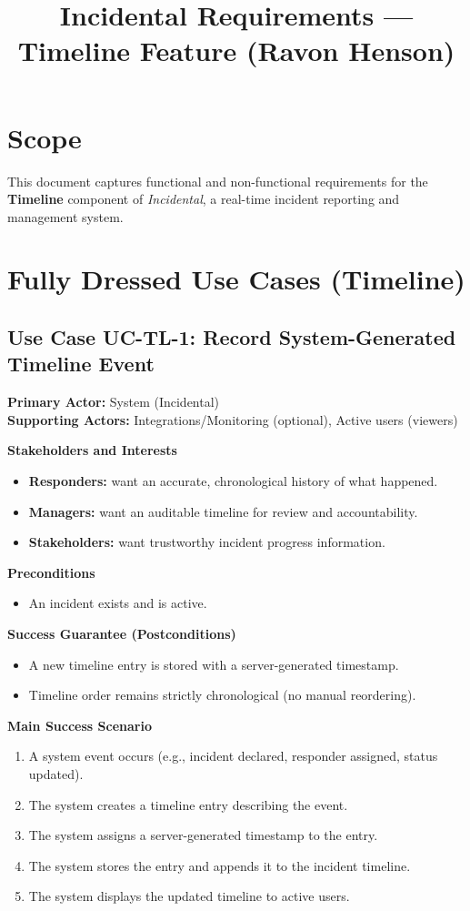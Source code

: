 \documentclass[11pt]{article}
\title{Incidental Requirements --- Timeline Feature (Ravon Henson)}
\date{}
\begin{document}
\maketitle

\section{Scope}
This document captures functional and non-functional requirements for the \textbf{Timeline} component of \textit{Incidental}, a real-time incident reporting and management system.

\section{Fully Dressed Use Cases (Timeline)}

\subsection*{Use Case UC-TL-1: Record System-Generated Timeline Event}
\textbf{Primary Actor:} System (Incidental) \\
\textbf{Supporting Actors:} Integrations/Monitoring (optional), Active users (viewers)

\textbf{Stakeholders and Interests}
\begin{itemize}[nosep]
  \item \textbf{Responders:} want an accurate, chronological history of what happened.
  \item \textbf{Managers:} want an auditable timeline for review and accountability.
  \item \textbf{Stakeholders:} want trustworthy incident progress information.
\end{itemize}

\textbf{Preconditions}
\begin{itemize}[nosep]
  \item An incident exists and is active.
\end{itemize}

\textbf{Success Guarantee (Postconditions)}
\begin{itemize}[nosep]
  \item A new timeline entry is stored with a server-generated timestamp.
  \item Timeline order remains strictly chronological (no manual reordering).
\end{itemize}

\textbf{Main Success Scenario}
\begin{enumerate}[nosep]
  \item A system event occurs (e.g., incident declared, responder assigned, status updated).
  \item The system creates a timeline entry describing the event.
  \item The system assigns a server-generated timestamp to the entry.
  \item The system stores the entry and appends it to the incident timeline.
  \item The system displays the updated timeline to active users.
\end{enumerate}
\end{document}
